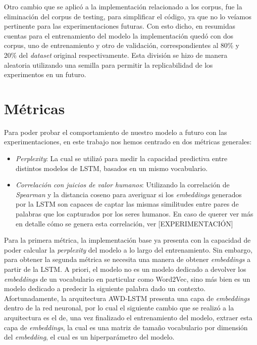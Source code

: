 Otro cambio que se aplicó a la implementación relacionado a los corpus, fue la eliminación del corpus de testing, para simplificar el código, ya que no lo veíamos pertinente para las experimentaciones futuras. Con esto dicho, en resumidas cuentas para el entrenamiento del modelo la implementación quedó con dos corpus, uno de entrenamiento y otro de validación, correspondientes al 80\% y 20\% del \textit{dataset} original respectivamente. Esta división se hizo de manera aleatoria utilizando una semilla para permitir la replicabilidad de los experimentos en un futuro.

\section{Métricas}
Para poder probar el comportamiento de nuestro modelo a futuro con las experimentaciones, en este trabajo nos hemos centrado en dos métricas generales:

\begin{itemize}
    \item \textit{Perplexity}: La cual se utilizó para medir la capacidad predictiva entre distintos modelos de LSTM, basados en un mismo vocabulario.
    \item \textit{Correlación con juicios de valor humanos}: Utilizando la correlación de \textit{Spearman} y la distancia coseno para averiguar si los \textit{embeddings} generados por la LSTM son capaces de captar las mismas similitudes entre pares de palabras que los capturados por los seres humanos. En caso de querer ver más en detalle cómo se genera esta correlación, ver [EXPERIMENTACIÓN]
\end{itemize}

Para la primera métrica, la implementación base ya presenta con la capacidad de poder calcular la \textit{perplexity} del modelo a lo largo del entrenamiento. Sin embargo, para obtener la segunda métrica se necesita una manera de obtener \textit{embeddings} a partir de la LSTM. A priori, el modelo no es un modelo dedicado a devolver los \textit{embeddings} de un vocabulario en particular como Word2Vec, sino más bien es un modelo dedicado a predecir la siguiente palabra dado un contexto. Afortunadamente, la arquitectura AWD-LSTM presenta una capa de \textit{embeddings} dentro de la red neuronal, por lo cual el siguiente cambio que se realizó a la arquitectura es el de, una vez finalizado el entrenamiento del modelo, extraer esta capa de \textit{embeddings}, la cual es una matriz de tamaño vocabulario por dimensión del \textit{embedding}, el cual es un hiperparámetro del modelo. 


